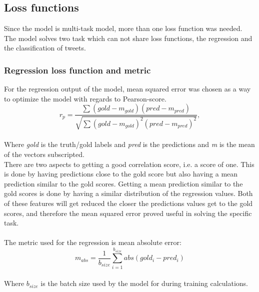 \subsection{Loss functions}
Since the model is multi-task model, more than one loss function was needed. The model solves two task which can not share loss functions, the regression and the classification of tweets.

\subsubsection*{Regression loss function and metric}
For the regression output of the model, mean squared error was chosen as a way to optimize the model with regards to Pearson-score.\\
\begin{equation} \label{eq:pearson}
r_{p} = \dfrac{\sum \left(gold-m_{gold}\right) \left(pred-m_{pred}\right)}{\sqrt{\sum \left(gold-m_{gold}\right)^{2} \left(pred-m_{pred}\right)^{2}}},
\end{equation}\\
Where \textit{gold} is the truth/gold labels and \textit{pred} is the predictions and \textit{m} is the mean of the vectors subscripted.\\
There are two aspects to getting a good correlation score, i.e. a score of one. This is done by having predictions close to the gold score but also having a mean prediction similar to the gold scores. Getting a mean prediction similar to the gold scores is done by having a similar distribution of the regression values. Both of these features will get reduced the closer the predictions values get to the gold scores, and therefore the mean squared error proved useful in solving the specific task.\\
\\
The metric used for the regression is mean absolute error:\\
\begin{equation} \label{eq:meanabs}
m_{abs}=\dfrac{1}{b_{size}}\sum^{b_{size}}_{i=1}abs\left(gold_{i}-pred_{i}\right)
\end{equation}\\
Where $b_{size}$ is the batch size used by the model for during training calculations. 

